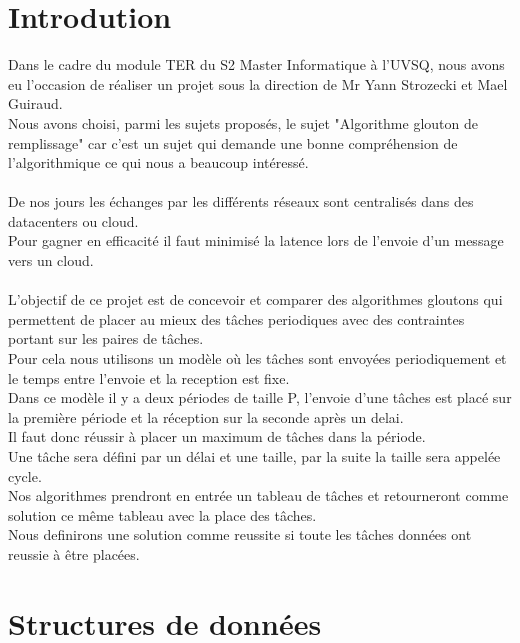 \documentclass[11pt]{article}
\title{\vspace{13em}{\huge TER}}
\author{Rémi Navarro - 21401257\\ Edouard Fouassier - 21400750}
\begin{document}
\clearpage
\maketitle\vspace{13em}
\newpage
\tableofcontents
\newpage
\clearpage
{}
\section{Introdution}
Dans le cadre du module TER du S2 Master Informatique à l’UVSQ, nous avons eu l’occasion de réaliser un projet sous la direction de Mr Yann Strozecki et Mael Guiraud.\\
Nous avons choisi, parmi les sujets proposés, le sujet "Algorithme glouton de remplissage" car c'est un sujet qui demande une bonne compréhension de l'algorithmique ce qui nous a beaucoup intéressé.\\\\
De nos jours les échanges par les différents réseaux sont centralisés dans des datacenters ou cloud.\\
Pour gagner en efficacité il faut minimisé la latence lors de l'envoie d'un message vers un cloud.\\\\
L'objectif de ce projet est de concevoir et comparer des algorithmes gloutons qui permettent de placer au mieux des tâches periodiques avec des contraintes portant sur les paires de tâches.\\
Pour cela nous utilisons un modèle où les tâches sont envoyées periodiquement et le temps entre l'envoie et la reception est fixe.\\
Dans ce modèle il y a deux périodes de taille P, l'envoie d'une tâches est placé sur la première période et la réception sur la seconde après un delai.\\
Il faut donc réussir à placer un maximum de tâches dans la période.\\
Une tâche sera défini par un délai et une taille, par la suite la taille sera appelée cycle.\\
Nos algorithmes prendront en entrée un tableau de tâches et retourneront comme solution ce même tableau avec la place des tâches.\\
Nous definirons une solution comme reussite si toute les tâches données ont reussie à être placées.\\

\newpage
\section{Structures de données}
\end{document}
